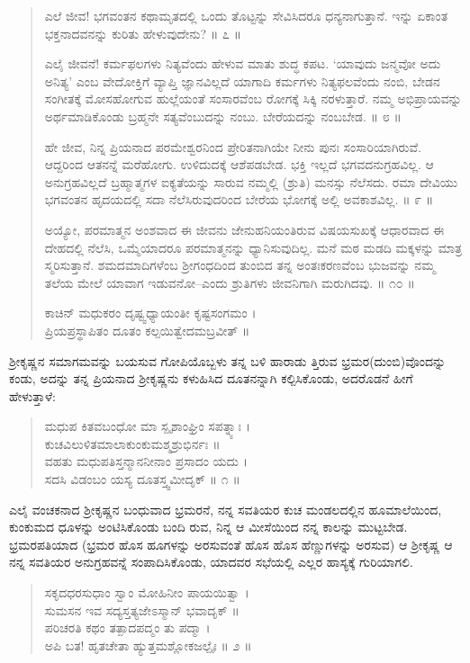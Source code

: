 \begin{verse}
{ಎಲೆ ಜೀವ! ಭಗವಂತನ ಕಥಾಮೃತದಲ್ಲಿ ಒಂದು ತೊಟ್ಟನ್ನು ಸೇವಿಸಿದರೂ ಧನ್ಯನಾಗುತ್ತಾನೆ. ಇನ್ನು ಏಕಾಂತ ಭಕ್ತನಾದವನನ್ನು ಕುರಿತು ಹೇಳುವುದೇನು? \num{॥ ೭ ॥}

ಎಲೈ ಜೀವನೆ! ಕರ್ಮಫಲಗಳು ನಿತ್ಯವೆಂದು ಹೇಳುವ ಮಾತು ಶುದ್ಧ ಕಪಟ. ‘ಯಾವುದು ಜನ್ಮವೋ ಅದು ಅನಿತ್ಯ’ ಎಂಬ ವೇದೋಕ್ತಿಗೆ ವ್ಯಾಪ್ತಿ ಜ್ಞಾನವಿಲ್ಲದೆ ಯಾಗಾದಿ ಕರ್ಮಗಳು ನಿತ್ಯಫಲವೆಂದು ನಂಬಿ, ಬೇಡನ ಸಂಗೀತಕ್ಕೆ ಮೋಸಹೋಗುವ ಹುಲ್ಲೆಯಂತೆ ಸಂಸಾರವೆಂಬ ರೋಗಕ್ಕೆ ಸಿಕ್ಕಿ ನರಳುತ್ತಾರೆ. ನಮ್ಮ ಅಭಿಪ್ರಾಯವನ್ನು ಅರ್ಥಮಾಡಿಕೊಂಡು ಬ್ರಹ್ಮನೇ ಸತ್ಯವೆಂಬುದನ್ನು ನಂಬು. ಬೇರೆಯದನ್ನು ನಂಬಬೇಡ. \num{॥ ೮ ॥}

ಹೇ ಜೀವ, ನಿನ್ನ ಪ್ರಿಯನಾದ ಪರಮೇಶ್ವರನಿಂದ ಪ್ರೇರಿತನಾಗಿಯೇ ನೀನು ಪುನಃ ಸಂಸಾರಿಯಾಗಿರುವೆ. ಆದ್ದರಿಂದ ಆತನನ್ನೆ ಮರೆಹೋಗು. ಉಳಿದುದಕ್ಕೆ ಆಶೆಪಡಬೇಡ. ಭಕ್ತಿ ಇಲ್ಲದೆ ಭಗವದನುಗ್ರಹವಿಲ್ಲ. ಆ ಅನುಗ್ರಹವಿಲ್ಲದೆ ಬ್ರಹ್ಮಾತ್ಮಗಳ ಐಕ್ಯತೆಯನ್ನು ಸಾರುವ ನಮ್ಮಲ್ಲಿ (ಶ್ರುತಿ) ಮನಸ್ಸು ನೆಲೆಸದು. ರಮಾ ದೇವಿಯು ಭಗವಂತನ ಹೃದಯದಲ್ಲಿ ಸದಾ ನೆಲೆಸಿರುವುದರಿಂದ ಬೇರೆಯ ಭೋಗಕ್ಕೆ ಅಲ್ಲಿ ಅವಕಾಶವಿಲ್ಲ. \num{॥ ೯ ॥}

ಅಯ್ಯೋ, ಪರಮಾತ್ಮನ ಅಂಶವಾದ ಈ ಜೀವನು ಜೇನುಹನಿಯಂತಿರುವ ವಿಷಯಸುಖಕ್ಕೆ ಆಧಾರವಾದ ಈ ದೇಹದಲ್ಲಿ ನೆಲೆಸಿ, ಒಮ್ಮೆಯಾದರೂ ಪರಮಾತ್ಮನನ್ನು ಧ್ಯಾನಿಸುವುದಿಲ್ಲ. ಮನೆ ಮಠ ಮಡದಿ ಮಕ್ಕಳನ್ನು ಮಾತ್ರ ಸ್ಮರಿಸುತ್ತಾನೆ. ಶಮದಮಾದಿಗಳೆಂಬ ಶ್ರೀಗಂಧದಿಂದ ತುಂಬಿದ ತನ್ನ ಅಂತಃಕರಣವೆಂಬ ಭುಜವನ್ನು ನಮ್ಮ ತಲೆಯ ಮೇಲೆ ಯಾವಾಗ ಇಡುವನೋ–ಎಂದು ಶ್ರುತಿಗಳು ಜೀವನಿಗಾಗಿ ಮರುಗಿದವು. \num{॥ ೧೦ ॥}}ಕಾಚಿನ್ ಮಧುಕರಂ ದೃಷ್ಟ್ವಧ್ಯಾಯಂತೀ ಕೃಷ್ಟಸಂಗಮಂ ।\\ಪ್ರಿಯಪ್ರಸ್ಥಾಪಿತಂ ದೂತಂ ಕಲ್ಪಯಿತ್ವೇದಮಬ್ರವೀತ್ ॥
\end{verse}

ಶ್ರೀಕೃಷ್ಣನ ಸಮಾಗಮವನ್ನು ಬಯಸುವ ಗೋಪಿಯೊಬ್ಬಳು ತನ್ನ ಬಳಿ ಹಾರಾಡು ತ್ತಿರುವ ಭ್ರಮರ(ದುಂಬಿ)ವೊಂದನ್ನು ಕಂಡು, ಅದನ್ನು ತನ್ನ ಪ್ರಿಯನಾದ ಶ್ರೀಕೃಷ್ಣನು ಕಳುಹಿಸಿದ ದೂತನನ್ನಾಗಿ ಕಲ್ಪಿಸಿಕೊಂಡು, ಅದರೊಡನೆ ಹೀಗೆ ಹೇಳುತ್ತಾಳೆ:

\begin{verse}
ಮಧುಪ ಕಿತವಬಂಧೋ ಮಾ ಸ್ಪೃಶಾಂಘ್ರಿಂ ಸಪತ್ನ್ಯಾಃ ।\\ಕುಚವಿಲುಳಿತಮಾಲಾಕುಂಕುಮಶ್ಮಶ್ರುಭಿರ್ನಃ ॥\\ವಹತು ಮಧುಪತಿಸ್ತನ್ಮಾನನೀನಾಂ ಪ್ರಸಾದಂ ಯದು ।\\ಸದಸಿ ವಿಡಂಬಂ ಯಸ್ಯ ದೂತಸ್ತ್ವಮೀದೃಕ್ \num{॥ ೧ ॥}
\end{verse}

ಎಲೈ ವಂಚಕನಾದ ಶ್ರೀಕೃಷ್ಣನ ಬಂಧುವಾದ ಭ್ರಮರನೆ, ನನ್ನ ಸವತಿಯರ ಕುಚ ಮಂಡಲದಲ್ಲಿನ ಹೂಮಾಲೆಯಿಂದ, ಕುಂಕುಮದ ಧೂಳನ್ನು ಅಂಟಿಸಿಕೊಂಡು ಬಂದಿ ರುವ, ನಿನ್ನ ಆ ಮೀಸೆಯಿಂದ ನನ್ನ ಕಾಲನ್ನು ಮುಟ್ಟಬೇಡ. ಭ್ರಮರಪತಿಯಾದ (ಭ್ರಮರ ಹೊಸ ಹೂಗಳನ್ನು ಅರಸುವಂತೆ ಹೊಸ ಹೊಸ ಹೆಣ್ಣುಗಳನ್ನು ಅರಸುವ) ಆ ಶ್ರೀಕೃಷ್ಣ ಆ ನನ್ನ ಸವತಿಯರ ಅನುಗ್ರಹವನ್ನೆ ಸಂಪಾದಿಸಿಕೊಂಡು, ಯಾದವರ ಸಭೆಯಲ್ಲಿ ಎಲ್ಲರ ಹಾಸ್ಯಕ್ಕೆ ಗುರಿಯಾಗಲಿ.

\begin{verse}
ಸಕೃದಧರಸುಧಾಂ ಸ್ವಾಂ ಮೋಹಿನೀಂ ಪಾಯಯಿತ್ವಾ ।\\ಸುಮಸನ ಇವ ಸದ್ಯಸ್ತತ್ಯಜೇಽಸ್ಮಾನ್ ಭವಾದೃಕ್ ॥\\ಪರಿಚರತಿ ಕಥಂ ತತ್ಪಾದಪದ್ಮಂ ತು ಪದ್ಮಾ ।\\ಅಪಿ ಬತ! ಹೃತಚೇತಾ ಹ್ಯುತ್ತಮಶ್ಲೋಕಜಲ್ಪೈಃ \num{॥ ೨ ॥}
\end{verse}

